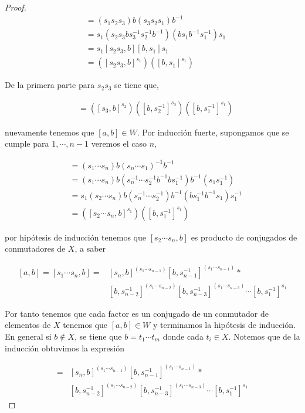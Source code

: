 \begin{proof}
\begin{align*}
[s_1s_2s_3,b] & =(s_1s_2s_3)b(s_3s_2s_1)b^{-1} \\
& = s_1(s_2s_3 b s_3^{-1} s_2^{-1} b^{-1})(bs_1b^{-1}s_1^{-1})s_1 \\ 
& = s_1 [s_2 s_3 ,b][b,s_1]s_1\\
& =([s_2 s_3,b]^{s_1})([b,s_1]^{s_1})
\end{align*}

De la primera parte para $s_2 s_3$ se tiene que,

\begin{align*}
[s_1s_2s_3,b] & = ([s_3,b]^{s_2})([b,s_2^{-1}]^{s_2})([b,s_1^{-1}]^{s_1})
\end{align*}

nuevamente tenemos que $[a,b] \in W.$ Por inducción fuerte, supongamos que se cumple para $1, \cdots, n-1$ veremos el caso $n$,

\begin{align*}
[s_1 \cdots s_n,b] & =(s_1 \cdots s_n)b(s_n \cdots s_1)^{-1} b^{-1} \\
& = (s_1 \cdots s_n)b(s_n^{-1} \cdots s_2^{-1 }b^{-1}b s_1^{-1})b^{-1}(s_1 s_1^{-1}) \\
& = s_1( s_2\cdots s_n )b(s_n^{-1}  \cdots s_2^{-1} )b^{-1}(b s_1^{-1}  b^{-1}s_1) s_1^{-1}  \\
& = ([ s_2 \cdots s_n,b]^{s_1})([b,s_1^{-1} ]^{s_1})
\end{align*}



por hipótesis de inducción tenemos que $[ s_2 \cdots s_n,b]$ es producto de conjugados de conmutadores de $X$, a saber

\begin{align*}\label{eq:induccion}
[a,b]=[s_1 \cdots s_n , b]  = & [ s_n , b] ^{(s_1 \cdots s_{n-1})}[b,s_{n-1}^{-1}]^{(s_1  \cdots s_{n-1})} * \\ 
& [b,s_{n-2}^{-1}]^{(s_1 \cdots s_{n-2})} [b,s_{n-3}^{-1}]^{(s_1  \cdots s_{n-3} )} \cdots [b,s_1^{-1}]^{s_1}
\end{align*}

Por tanto tenemos que cada factor es un conjugado  de un conmutador de elementos de $X$ tenemos que $[a,b] \in W$ y terminamos la hipótesis de inducción. En general si $b\not\in X$, se tiene que $b=t_1 \cdots t_m$ donde cada $t_i \in X$. Notemos que de la inducción obtuvimos la expresión 

\begin{align*}
[a, b]  = & [ s_n , b] ^{(s_1 \cdots s_{n-1})}[b,s_{n-1}^{-1}]^{(s_1  \cdots s_{n-1})} * \\ 
& [b,s_{n-2}^{-1}]^{(s_1 \cdots s_{n-2})} [b,s_{n-3}^{-1}]^{(s_1  \cdots s_{n-3} )} \cdots [b,s_1^{-1}]^{s_1}
\end{align*}


\end{proof}
